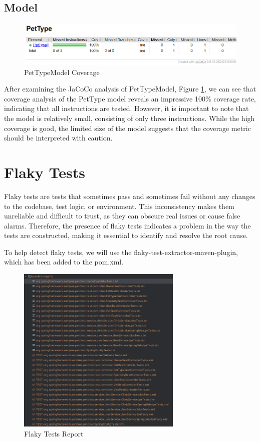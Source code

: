 \documentclass[a4paper,11pt,openright,BCOR=15mm]{scrbook}
\begin{document}
		
		
		\subsection{Model}
		\begin{figure}[H]
			\centering
			\includegraphics[width=\textwidth]{figs/Funcional Correctness/PetTypeModel.png}
			\caption{PetTypeModel Coverage}
			\label{fig:PetTypeModel}
		\end{figure}
		After examining the JaCoCo analysis of PetTypeModel, Figure \ref{fig:PetTypeModel}, we can see that coverage analysis of the PetType model reveals an impressive 100\% coverage rate, indicating that all instructions are tested. However, it is important to note that the model is relatively small, consisting of only three instructions. While the high coverage is good, the limited size of the model suggests that the coverage metric should be interpreted with caution.
		
		
		\section{Flaky Tests}
		
			Flaky tests are tests that sometimes pass and sometimes fail without any changes to the codebase, test logic, or environment. This inconsistency makes them unreliable and difficult to trust, as they can obscure real issues or cause false alarms. Therefore, the presence of flaky tests indicates a problem in the way the tests are constructed, making it essential to identify and resolve the root cause.

		To help detect flaky tests, we will use the flaky-test-extractor-maven-plugin, which has been added to the pom.xml.


		\begin{figure}[H]
		  \centering
		  \includegraphics[width=0.7\textwidth]{figs/Funcional Correctness/FlakyTestsReport.png}
		  \caption{Flaky Tests Report}
		  \label{fig:FlakyTestsReport}
		\end{figure}
\end{document}
